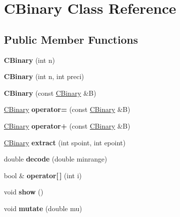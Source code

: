 \hypertarget{class_c_binary}{}\section{C\+Binary Class Reference}
\label{class_c_binary}
\subsection*{Public Member Functions}
\begin{DoxyCompactItemize}
\item 
\mbox{\label{class_c_binary_ae169bcfb91965eb524268364b34fee15}} 
{\bfseries C\+Binary} (int n)
\item 
\mbox{\label{class_c_binary_a664225c93b2e0fba40afda3d652b68c1}} 
{\bfseries C\+Binary} (int n, int preci)
\item 
\mbox{\label{class_c_binary_a9ce5e3ccd45823f0cabadddac852bc3b}} 
{\bfseries C\+Binary} (const \hyperlink{class_c_binary}{C\+Binary} \&B)
\item 
\mbox{\label{class_c_binary_a29abeb41c5083debfb5e6dfc8859a4eb}} 
\hyperlink{class_c_binary}{C\+Binary} {\bfseries operator=} (const \hyperlink{class_c_binary}{C\+Binary} \&B)
\item 
\mbox{\label{class_c_binary_a1fcced08282fc274e77f8931bef40b80}} 
\hyperlink{class_c_binary}{C\+Binary} {\bfseries operator+} (const \hyperlink{class_c_binary}{C\+Binary} \&B)
\item 
\mbox{\label{class_c_binary_a1e0f9f380a09a42ec6822af1f895e374}} 
\hyperlink{class_c_binary}{C\+Binary} {\bfseries extract} (int spoint, int epoint)
\item 
\mbox{\label{class_c_binary_aeae50497a5511248dab159dbcdd521d9}} 
double {\bfseries decode} (double minrange)
\item 
\mbox{\label{class_c_binary_a4c93189c1d7bffacc30cbbebbf944674}} 
bool \& {\bfseries operator\mbox{[}$\,$\mbox{]}} (int i)
\item 
\mbox{\label{class_c_binary_a3d7b4e4a160425fa55db038322ab8fbb}} 
void {\bfseries show} ()
\item 
\mbox{\label{class_c_binary_a141be3b1218faca052bb4028e634e5de}} 
void {\bfseries mutate} (double mu)
\end{DoxyCompactItemize}
